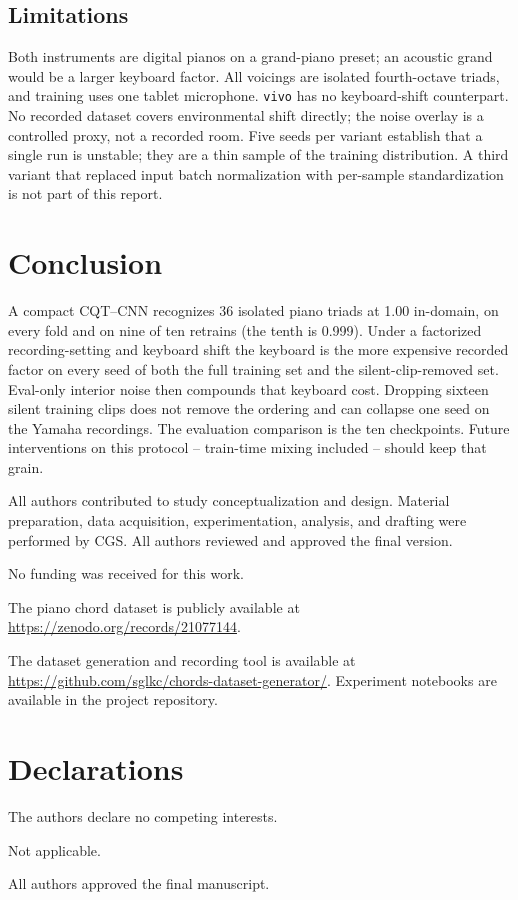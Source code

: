 \documentclass[pdflatex,sn-mathphys-num,iicol]{sn-jnl}
\theoremstyle{thmstyleone}
\theoremstyle{thmstyletwo}
\theoremstyle{thmstylethree}
\begin{document}
\subsection{Limitations}\label{subsec5_3}

Both instruments are digital pianos on a grand-piano preset; an acoustic grand would be a larger keyboard factor. All voicings are isolated fourth-octave triads, and training uses one tablet microphone. \texttt{vivo} has no keyboard-shift counterpart. No recorded dataset covers environmental shift directly; the noise overlay is a controlled proxy, not a recorded room. Five seeds per variant establish that a single run is unstable; they are a thin sample of the training distribution. A third variant that replaced input batch normalization with per-sample standardization is not part of this report.

\section{Conclusion}\label{sec6}

A compact CQT--CNN recognizes 36 isolated piano triads at 1.00 in-domain, on every fold and on nine of ten retrains (the tenth is 0.999). Under a factorized recording-setting and keyboard shift the keyboard is the more expensive recorded factor on every seed of both the full training set and the silent-clip-removed set. Eval-only interior noise then compounds that keyboard cost. Dropping sixteen silent training clips does not remove the ordering and can collapse one seed on the Yamaha recordings. The evaluation comparison is the ten checkpoints. Future interventions on this protocol -- train-time mixing included -- should keep that grain.

\backmatter

All authors contributed to study conceptualization and design. Material preparation, data acquisition, experimentation, analysis, and drafting were performed by CGS. All authors reviewed and approved the final version.

No funding was received for this work.

The piano chord dataset is publicly available at \url{https://zenodo.org/records/21077144}.

The dataset generation and recording tool is available at \url{https://github.com/sglkc/chords-dataset-generator/}. Experiment notebooks are available in the project repository.

\section*{Declarations}

The authors declare no competing interests.

Not applicable.

All authors approved the final manuscript.


\end{document}
